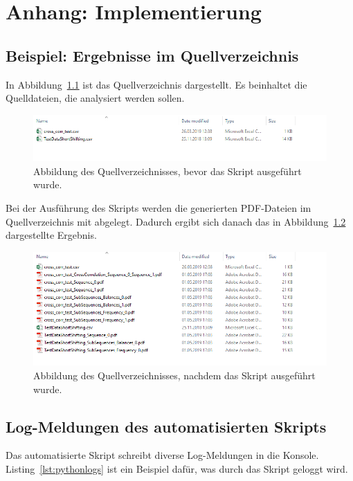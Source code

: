 \chapter{Anhang: Implementierung}
\section{Beispiel: Ergebnisse im Quellverzeichnis}
\label{attachement:python:results}
In Abbildung~\ref{fig:source_folder} ist das Quellverzeichnis dargestellt.
Es beinhaltet die Quelldateien, die analysiert werden sollen.
\begin{figure}[H]
	\includegraphics[width=\linewidth]{attachements/python/source_folder.PNG}
	\caption[Anhang: Quellverzeichnis vor der Ausführung]{Abbildung des Quellverzeichnisses, bevor das Skript ausgeführt wurde\footnotemark.}
	\label{fig:source_folder}
\end{figure}

Bei der Ausführung des Skripts werden die generierten PDF-Dateien im Quellverzeichnis mit abgelegt.
Dadurch ergibt sich danach das in Abbildung~\ref{fig:source_folder_results} dargestellte Ergebnis.
\begin{figure}[H]
	\includegraphics[width=\linewidth]{attachements/python/source_folder_result.PNG}
	\caption[Anhang: Quellverzeichnis nach der Ausführung]{Abbildung des Quellverzeichnisses, nachdem das Skript ausgeführt wurde\footnotemark.}
	\label{fig:source_folder_results}
\end{figure}

\section{Log-Meldungen des automatisierten Skripts}
\label{attachement:python:log}
Das automatisierte Skript schreibt diverse Log-Meldungen in die Konsole.
Listing~\ref{lst:pythonlogs} ist ein Beispiel dafür, was durch das Skript geloggt wird.

